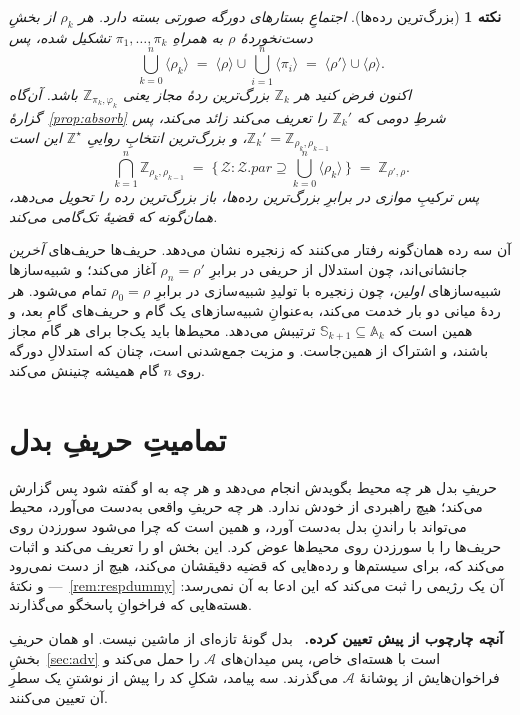 \documentclass[10pt,oneside,openany]{book}
\newcommand{\pars}{\mathit{par}}
\newcommand{\Zenv}{\mathcal{Z}}
\newcommand{\Adv}{\mathcal{A}}
\newcommand{\Aset}{\mathbb{A}}
\newcommand{\SimSet}{\mathbb{S}}
\newcommand{\ZenvSet}{\mathbb{Z}}
\newcommand{\ncl}[1]{\langle #1 \rangle}
\newcommand{\heading}[1]{\medskip\par\noindent\textcolor{accent}{\textbf{#1.}}\ }
\theoremstyle{accentdef}
\newtheorem{remark}[definition]{نکته}
\theoremstyle{accentplain}
\begin{document}
\begin{remark}[بزرگ‌ترین رده‌ها]\label{rem:parclasses}
اجتماعِ بستارهای دورگه صورتی بسته دارد. هر $\rho_k$ از بخشِ دست‌نخوردهٔ
$\rho$ به همراهِ $\pi_1,\dots,\pi_k$ تشکیل شده، پس
\[
  \bigcup_{k=0}^{n} \ncl{\rho_k} \;=\; \ncl{\rho} \cup \bigcup_{i=1}^{n} \ncl{\pi_i} \;=\; \ncl{\rho'} \cup \ncl{\rho} .
\]
اکنون فرض کنید هر $\ZenvSet_k$ بزرگ‌ترین ردهٔ مجاز یعنی
$\ZenvSet_{\pi_k,\varphi_k}$ باشد. آن‌گاه گزارهٔ~\ref{prop:absorb} شرطِ
دومی که $\ZenvSet_k'$ را تعریف می‌کند زائد می‌کند، پس $\ZenvSet_k' =
\ZenvSet_{\rho_k,\rho_{k-1}}$، و بزرگ‌ترین انتخابِ رواییِ
$\ZenvSet^{\star}$ این است
\[
  \bigcap_{k=1}^{n} \ZenvSet_{\rho_k,\rho_{k-1}}
  \;=\; \bigl\{\, \Zenv : \Zenv.\pars \supseteq \textstyle\bigcup_{k=0}^{n} \ncl{\rho_k} \,\bigr\}
  \;=\; \ZenvSet_{\rho',\rho} .
\]
پس ترکیبِ موازی در برابرِ بزرگ‌ترین رده‌ها، باز بزرگ‌ترین رده را تحویل
می‌دهد، همان‌گونه که قضیهٔ تک‌گامی می‌کند.
\end{remark}

آن سه رده همان‌گونه رفتار می‌کنند که زنجیره نشان می‌دهد. حریف‌ها حریف‌های
\emph{آخرین} جانشانی‌اند، چون استدلال از حریفی در برابرِ $\rho_n = \rho'$
آغاز می‌کند؛ و شبیه‌سازها شبیه‌سازهای \emph{اولین}، چون زنجیره با تولیدِ
شبیه‌سازی در برابرِ $\rho_0 = \rho$ تمام می‌شود. هر ردهٔ میانی دو بار خدمت
می‌کند، به‌عنوانِ شبیه‌سازهای یک گام و حریف‌های گامِ بعد، و همین است که
$\SimSet_{k+1} \subseteq \Aset_k$ ترتیبش می‌دهد. محیط‌ها باید یک‌جا برای
هر گام مجاز باشند، و اشتراک از همین‌جاست. و مزیت جمع‌شدنی است، چنان که
استدلالِ دورگه روی $n$ گام همیشه چنینش می‌کند.

\section{تمامیتِ حریفِ بدل}\label{app:dummy}

حریفِ بدل هر چه محیط بگویدش انجام می‌دهد و هر چه به او گفته شود پس گزارش
می‌کند؛ هیچ راهبردی از خودش ندارد. هر چه حریفِ واقعی به‌دست می‌آورد، محیط
می‌تواند با راندنِ بدل به‌دست آورد، و همین است که چرا می‌شود سور‌زدن روی
حریف‌ها را با سور‌زدن روی محیط‌ها عوض کرد. این بخش او را تعریف می‌کند و
اثبات می‌کند که، برای سیستم‌ها و رده‌هایی که قضیه دقیقشان می‌کند، هیچ از
دست نمی‌رود --- و نکتهٔ~\ref{rem:respdummy} آن یک رژیمی را ثبت می‌کند که
این ادعا به آن نمی‌رسد: هسته‌هایی که فراخوانِ پاسخگو می‌گذارند.

\heading{آنچه چارچوب از پیش تعیین کرده} بدل گونهٔ تازه‌ای از ماشین نیست. او
همان حریفِ بخشِ~\ref{sec:adv} است با هسته‌ای خاص، پس میدان‌های $\Adv$ را
حمل می‌کند و فراخوان‌هایش از پوشانهٔ $\Adv$ می‌گذرند. سه پیامد، شکلِ کد را
پیش از نوشتنِ یک سطرِ آن تعیین می‌کنند.
\end{document}

